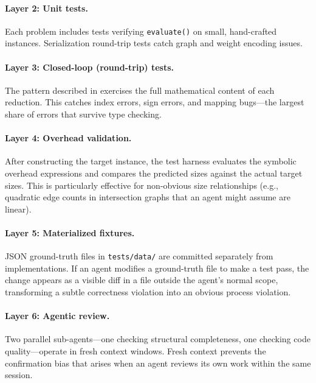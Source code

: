 \documentclass[conference]{IEEEtran}
\begin{document}
\paragraph{Layer 2: Unit tests.}
Each problem includes tests verifying \lstinline{evaluate()} on small, hand-crafted instances.
Serialization round-trip tests catch graph and weight encoding issues.

\paragraph{Layer 3: Closed-loop (round-trip) tests.}
The pattern described in  exercises the full mathematical content of each reduction.
This catches index errors, sign errors, and mapping bugs---the largest share of errors that survive type checking.

\paragraph{Layer 4: Overhead validation.}
After constructing the target instance, the test harness evaluates the symbolic overhead expressions and compares the predicted sizes against the actual target sizes.
This is particularly effective for non-obvious size relationships (e.g., quadratic edge counts in intersection graphs that an agent might assume are linear).

\paragraph{Layer 5: Materialized fixtures.}
JSON ground-truth files in \texttt{tests/data/} are committed separately from implementations.
If an agent modifies a ground-truth file to make a test pass, the change appears as a visible diff in a file outside the agent's normal scope, transforming a subtle correctness violation into an obvious process violation.

\paragraph{Layer 6: Agentic review.}
Two parallel sub-agents---one checking structural completeness, one checking code quality---operate in fresh context windows.
Fresh context prevents the confirmation bias that arises when an agent reviews its own work within the same session.
\end{document}
